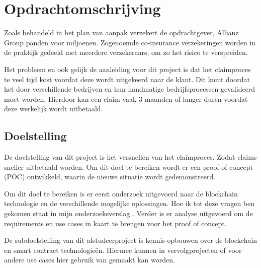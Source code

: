 \chapter{Opdrachtomschrijving}
Zoals behandeld in het plan van aanpak verzekert de opdrachtgever, Allianz Group panden voor miljoenen. Zogenoemde co-insurance verzekeringen worden in de praktijk gedeeld met meerdere verzekeraars, om zo het risico te verspreiden.\par

Het probleem en ook gelijk de aanleiding voor dit project is dat het claimproces te veel tijd kost voordat deze wordt uitgekeerd naar de klant. Dit komt doordat het door verschillende bedrijven en hun handmatige bedrijfsprocessen gevalideerd moet worden. Hierdoor kan een claim vaak 3 maanden of langer duren voordat deze werkelijk wordt uitbetaald.

\section{Doelstelling}
De doelstelling van dit project is het versnellen van het claimproces. Zodat claims sneller uitbetaald worden. Om dit doel te bereiken wordt er een proof of concept (POC) ontwikkeld, waarin de nieuwe situatie wordt gedemonstreerd.

Om dit doel te bereiken is er eerst onderzoek uitgevoerd naar de blockchain technologie en de verschillende mogelijke oplossingen. Hoe ik tot deze vragen ben gekomen staat in mijn onderzoeksverslag \cite{onderzoeksverslag}. Verder is er analyse uitgevoerd om de requirements en use cases in kaart te brengen voor het proof of concept.

De subdoelstelling van dit afstudeerproject is kennis opbouwen over de blockchain en smart contract technologieën. Hiermee kunnen in vervolgprojecten of voor andere use cases hier gebruik van gemaakt kan worden.
